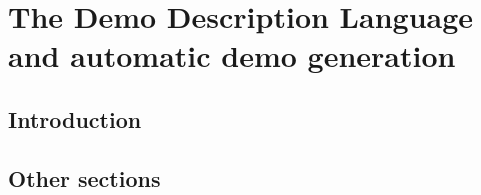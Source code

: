 \section{The Demo Description Language and automatic demo generation}

\subsection{Introduction}

\subsection{Other sections}
